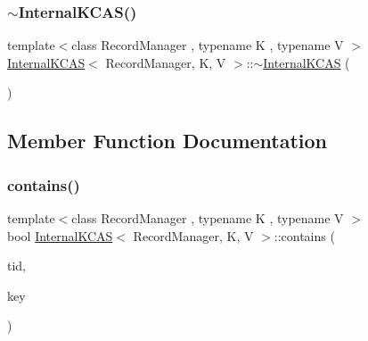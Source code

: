 \mbox{\label{classInternalKCAS_abd61df2bf061536a6565252d31d3f3f3}} 
\subsubsection{\texorpdfstring{$\sim$\+Internal\+K\+C\+A\+S()}{~InternalKCAS()}\hspace{0.1cm}{\footnotesize\ttfamily [2/2]}}
{\footnotesize\ttfamily template$<$class Record\+Manager , typename K , typename V $>$ \\
\hyperlink{classInternalKCAS}{Internal\+K\+C\+AS}$<$ Record\+Manager, K, V $>$\+::$\sim$\hyperlink{classInternalKCAS}{Internal\+K\+C\+AS} (\begin{DoxyParamCaption}{ }\end{DoxyParamCaption})}



\subsection{Member Function Documentation}
\mbox{\label{classInternalKCAS_a6cc67a7c0c48dcb3dfc92caf1661caff}} 
\subsubsection{\texorpdfstring{contains()}{contains()}\hspace{0.1cm}{\footnotesize\ttfamily [1/2]}}
{\footnotesize\ttfamily template$<$class Record\+Manager , typename K , typename V $>$ \\
bool \hyperlink{classInternalKCAS}{Internal\+K\+C\+AS}$<$ Record\+Manager, K, V $>$\+::contains (\begin{DoxyParamCaption}\item[{const int}]{tid,  }\item[{const K \&}]{key }\end{DoxyParamCaption})}

\mbox{\label{classInternalKCAS_a6cc67a7c0c48dcb3dfc92caf1661caff}} 
